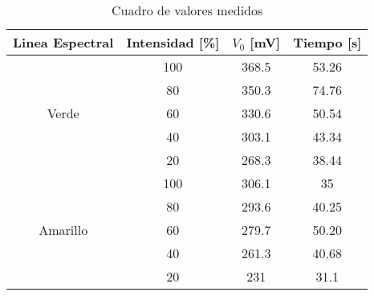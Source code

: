 \documentclass[a4paper,12pt]{report}
\begin{document}
    \begin{table}[h!]
      \centering
      \begin{tabular}{|c|c|c|c|}
      \hline
      Linea Espectral & Intensidad [\%] & $V_0$ [mV]& Tiempo [s]\\
      \hline
      \multirow{5}{*}{Verde} & 100 & 368.5 & 53.26 \\
                              \cline{2-4}
                              &  80 & 350.3 & 74.76 \\
                              \cline{2-4}
                              &  60 & 330.6 & 50.54 \\
                              \cline{2-4}
                              &  40 & 303.1 & 43.34 \\
                              \cline{2-4}
                              &  20 & 268.3 & 38.44 \\
      \hline
      \multirow{5}{*}{Amarillo} & 100 & 306.1 & 35 \\
                              \cline{2-4}
                                &  80 & 293.6 & 40.25 \\
                              \cline{2-4}
                                &  60 & 279.7 & 50.20 \\
                              \cline{2-4}
                                &  40 & 261.3 & 40.68 \\
                              \cline{2-4}
                                &  20 & 231 & 31.1 \\
      \hline
      \end{tabular}
      \caption{Cuadro de valores medidos}
    \label{tab:datos experiencia 1}
  \end{table}

  \newpage
\end{document}
